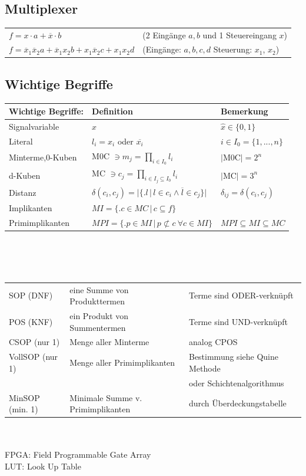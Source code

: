 \documentclass[6pt,a4paper]{scrartcl}
\newcommand{\iset}[2]{\ensuremath{\bigl\{ \bigl. #1 \, \bigr| \, #2 \bigr\}}}		%
\newcommand{\eset}[1]{\ensuremath{\bigl\{#1\bigr\}}}								%
\newcommand{\ol}[1]{\ensuremath{\overline{#1}}}									%
\begin{document}
\begin{multicols}{3}
\begin{tabular}{l|l|l}
	\end{tabular}
	\\
	
	
	\subsection{Multiplexer}
	\begin{tabular}{ll}
		$f = x \cdot a + \overline x \cdot b$ & (2 Eingänge $a,b$ und 1 Steuereingang $x$)\\
		$f = \ol x_1 \ol x_2 a + \ol x_1 x_2 b + x_1  \ol x_2 c + x_1 x_2d$ & (Eingänge: $a,b,c,d$  Steuerung: $x_1$, $x_2$)\\
	\end{tabular}



	\subsection{Wichtige Begriffe}
	\begin{tabular}{l|l|l}
		Wichtige Begriffe: & Definition & Bemerkung\\ \hline
		Signalvariable & $x$ & $\hat x \in \eset{0,1}$ \\
		Literal & $l_i = x_i$ oder $\overline{x_i}$ & $i \in I_0=\eset{1,...,n}$\\
		Minterme,0-Kuben & M0C $\ni m_j = \prod\limits_{i\in I_0} l_i$ & $|$M0C$| = 2^n$ \\
		d-Kuben & MC $\ni c_j = \prod\limits_{i\in I_j \subseteq I_0} l_i$ & $|$MC$|=3^n$\\
		Distanz & $\delta(c_i,c_j) = \bigl| \iset{l}{l \in c_i \land \overline{l}\in c_j}  \bigr|$ & $\delta_{ij} = \delta(c_i,c_j)$ \\
		Implikanten & $MI = \iset{c \in MC}{c \subseteq f}$ &  \\
		Primimplikanten & $MPI = \iset{p \in MI}{p \not\subset c \ \forall c \in MI}$ & $MPI \subseteq MI \subseteq MC$\\
	\end{tabular}\\ \\ \\
	\begin{tabular}{l|l|l}	
		SOP (DNF) & eine Summe von Produkttermen & Terme sind ODER-verknüpft \\
		POS (KNF) & ein Produkt von Summentermen & Terme sind UND-verknüpft\\
		CSOP (nur 1)& Menge aller Minterme & analog CPOS \\
		VollSOP (nur 1)& Menge aller Primimplikanten & Bestimmung siehe Quine Methode\\
		& & oder Schichtenalgorithmus\\
		MinSOP (min. 1)& Minimale Summe v. Primimplikanten & durch Überdeckungstabelle \\
	\end{tabular}
	\\ \\
	FPGA: Field Programmable Gate Array\\
	LUT: Look Up Table\\



\end{multicols}
\end{document}
